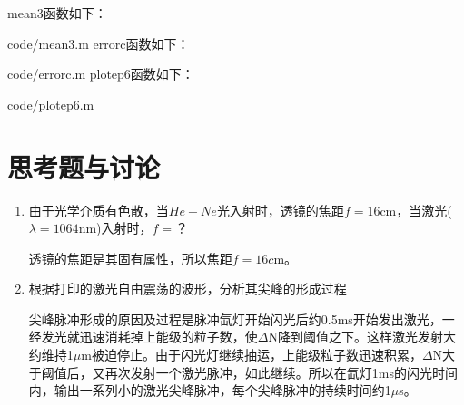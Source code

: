 \documentclass[UTF8]{ctexart}
\begin{document}
mean3函数如下：
		
		{code/mean3.m}
errorc函数如下：
		
		{code/errorc.m}
plotep6函数如下：

{code/plotep6.m}
\section{ 思考题与讨论}
	\begin{enumerate}
		\item 由于光学介质有色散，当$He-Ne$光入射时，透镜的焦距$f=16$cm，当激光($\lambda = 1064$nm)入射时，$f=$？
		
		透镜的焦距是其固有属性，所以焦距$f=16c$m。
	
		\item 根据打印的激光自由震荡的波形，分析其尖峰的形成过程
			
 尖峰脉冲形成的原因及过程是脉冲氙灯开始闪光后约0.5ms开始发出激光，一经发光就迅速消耗掉上能级的粒子数，使$\Delta$N降到阈值之下。这样激光发射大约维持1$\mu$m被迫停止。由于闪光灯继续抽运，上能级粒子数迅速积累，$\Delta$N大于阈值后，又再次发射一个激光脉冲，如此继续。所以在氙灯1ms的闪光时间内，输出一系列小的激光尖峰脉冲，每个尖峰脉冲的持续时间约1$\mu$s。
	\end{enumerate}
\end{document}
